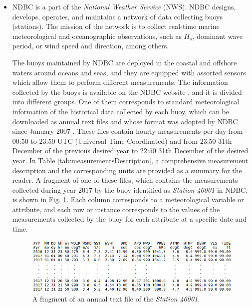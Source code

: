 \documentclass[energies,article,submit,moreauthors,pdftex]{Definitions/mdpi}
\begin{document}
		\begin{itemize}
			
			\item NDBC is a part of the \textit{National Weather Service} (NWS). NDBC designs, develops, operates, and maintains a network of data collecting buoys (stations). The mission of the network is to collect real-time marine meteorological and oceanographic observations, such as $H_s$, dominant wave period, or wind speed and direction, among others.

			The buoys maintained by NDBC are deployed in the coastal and offshore waters around oceans and seas, and they are equipped with assorted sensors which allow them to perform different measurements. The information collected by the buoys is available on the NDBC website \cite{NOAA_1}, and it is divided into different groups. One of them corresponds to standard meteorological information of the historical data collected by each buoy, which can be downloaded as annual text files and whose format was adopted by NDBC since January 2007 \cite {NOAA_2}. These files contain hourly measurements per day from $00$:$50$ to $23$:$50$ UTC (Universal Time Coordinated) and from $23$:$50$ 31th December of the previous desired year to $22$:$50$ 31th December of the desired year. In Table \ref{tab:measurementsDescription}, a comprehensive measurement description and the corresponding units are provided as a summary for the reader. A fragment of one of these files, which contains the measurements collected during year $2017$ by the buoy identified as \textit{Station 46001} in NDBC, is shown in Fig. \ref{fig:fragmentAnnualTexFile}. Each column corresponds to a meteorological variable or attribute, and each row or instance corresponds to the values of the measurements collected by the buoy for each attribute at a specific date and time.

			\begin{figure}[ht!]
				\centering
				\includegraphics[scale=0.50]{figures/FigureFragmentAnnualTextFile.png}
				\caption{A fragment of an annual text file of the \textit{Station 46001}.}
				\label{fig:fragmentAnnualTexFile}
			\end{figure}
			

\end{itemize}
\end{document}
